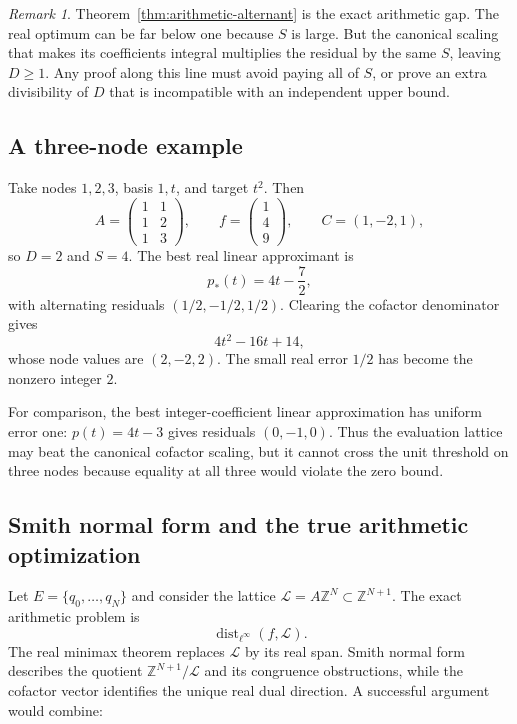 \documentclass[11pt,oneside]{article}
\theoremstyle{definition}
\theoremstyle{remark}
\newtheorem{remark}[theorem]{Remark}
\newcommand{\Z}{\mathbb Z}
\newcommand{\dist}{\operatorname{dist}}
\begin{document}
\begin{remark}
Theorem~\ref{thm:arithmetic-alternant} is the exact arithmetic gap.  The real optimum can be
far below one because $S$ is large.  But the canonical scaling that makes its coefficients
integral multiplies the residual by the same $S$, leaving $D\ge1$.  Any proof along this line
must avoid paying all of $S$, or prove an extra divisibility of $D$ that is incompatible with
an independent upper bound.
\end{remark}

\subsection{A three-node example}

Take nodes $1,2,3$, basis $1,t$, and target $t^2$.  Then
\[
 A=\begin{pmatrix}1&1\\1&2\\1&3\end{pmatrix},
 \qquad
 f=\begin{pmatrix}1\\4\\9\end{pmatrix},
 \qquad
 C=(1,-2,1),
\]
so $D=2$ and $S=4$.  The best real linear approximant is
\[
 p_*(t)=4t-\frac72,
\]
with alternating residuals $(1/2,-1/2,1/2)$.  Clearing the cofactor denominator gives
\[
 4t^2-16t+14,
\]
whose node values are $(2,-2,2)$.  The small real error $1/2$ has become the nonzero integer
$2$.

For comparison, the best integer-coefficient linear approximation has uniform error one:
$p(t)=4t-3$ gives residuals $(0,-1,0)$.  Thus the evaluation lattice may beat the canonical
cofactor scaling, but it cannot cross the unit threshold on three nodes because equality at
all three would violate the zero bound.

\subsection{Smith normal form and the true arithmetic optimization}

Let $E=\{q_0,\ldots,q_N\}$ and consider the lattice $\mathcal L=A\Z^N\subset\Z^{N+1}$.
The exact arithmetic problem is
\begin{equation}
 \dist_{\ell^\infty}(f,\mathcal L).
 \label{eq:lattice-distance}
\end{equation}
The real minimax theorem replaces $\mathcal L$ by its real span.  Smith normal form describes
the quotient $\Z^{N+1}/\mathcal L$ and its congruence obstructions, while the cofactor vector
identifies the unique real dual direction.  A successful argument would combine:
\end{document}

